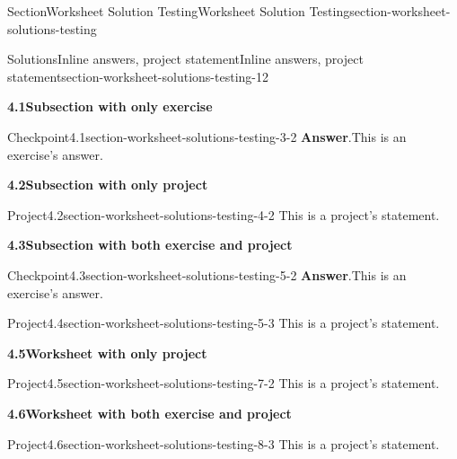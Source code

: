 \documentclass[oneside,10pt,]{article}
\newcommand{\blocktitlefont}{\relax}
\numberwithin{equation}{section}
\begin{document}
\begin{sectionptx}{Section}{Worksheet Solution Testing}{}{Worksheet Solution Testing}{}{}{section-worksheet-solutions-testing}
%
\begin{solutions-subsection}{Solutions}{Inline answers, project statement}{}{Inline answers, project statement}{}{}{section-worksheet-solutions-testing-12}
\par\medskip
\noindent\textbf{\normalsize{}4.1\space\textperiodcentered\space{}Subsection with only exercise}
\begin{inlinesolution}{Checkpoint}{4.1}{}{section-worksheet-solutions-testing-3-2}%
\noindent\textbf{\blocktitlefont Answer}.\hypertarget{section-worksheet-solutions-testing-3-2-2-main}{}\quad{}This is an exercise's answer.%
\end{inlinesolution}%
\par\medskip
\noindent\textbf{\normalsize{}4.2\space\textperiodcentered\space{}Subsection with only project}
\begin{projectsolution}{Project}{4.2}{}{section-worksheet-solutions-testing-4-2}%
This is a project's statement.%
\end{projectsolution}%
\par\medskip
\noindent\textbf{\normalsize{}4.3\space\textperiodcentered\space{}Subsection with both exercise and project}
\begin{inlinesolution}{Checkpoint}{4.3}{}{section-worksheet-solutions-testing-5-2}%
\noindent\textbf{\blocktitlefont Answer}.\hypertarget{section-worksheet-solutions-testing-5-2-2-main}{}\quad{}This is an exercise's answer.%
\end{inlinesolution}%
\begin{projectsolution}{Project}{4.4}{}{section-worksheet-solutions-testing-5-3}%
This is a project's statement.%
\end{projectsolution}%
\par\medskip
\noindent\textbf{\normalsize{}4.5\space\textperiodcentered\space{}Worksheet with only project}
\begin{projectsolution}{Project}{4.5}{}{section-worksheet-solutions-testing-7-2}%
This is a project's statement.%
\end{projectsolution}%
\par\medskip
\noindent\textbf{\normalsize{}4.6\space\textperiodcentered\space{}Worksheet with both exercise and project}
\begin{projectsolution}{Project}{4.6}{}{section-worksheet-solutions-testing-8-3}%
This is a project's statement.%
\end{projectsolution}%
\end{solutions-subsection}
%
%
\typeout{************************************************}

\end{sectionptx}
\end{document}
